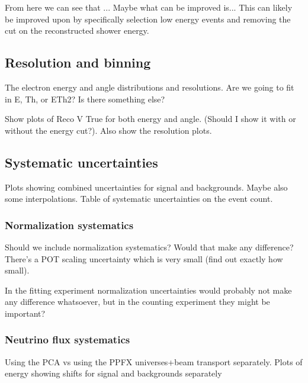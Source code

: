 \begin{sidewaysfigure}[!hb]
\begin{scriptsize}
\label{tab:CutflowTableBackground}
\end{scriptsize}
\end{sidewaysfigure}

From here we can see that ... Maybe what can be improved is...
This can likely be improved upon by specifically selection low energy events and removing the cut on the reconstructed shower energy. 

\subsection{Resolution and binning}
The electron energy and angle distributions and resolutions. Are we going to fit in E, Th, or ETh2? Is there something else?

Show plots of Reco V True for both energy and angle. (Should I show it with or without the energy cut?). Also show the resolution plots.

\subsection{Systematic uncertainties}
Plots showing combined uncertainties for signal and backgrounds. Maybe also some interpolations. Table of systematic uncertainties on the event count.

\subsubsection*{Normalization systematics}
Should we include normalization systematics? Would that make any difference? There's a POT scaling uncertainty which is very small (find out exactly how small).

In the fitting experiment normalization uncertainties would probably not make any difference whatsoever, but in the counting experiment they might be important?

\subsubsection*{Neutrino flux systematics}
Using the PCA vs using the PPFX universes+beam transport separately. Plots of energy showing shifts for signal and backgrounds separately

